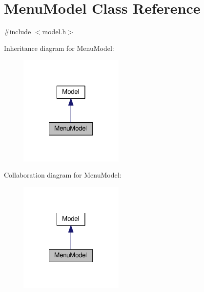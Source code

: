\hypertarget{classMenuModel}{\section{Menu\-Model Class Reference}
\label{classMenuModel}
}


{\ttfamily \#include $<$model.\-h$>$}



Inheritance diagram for Menu\-Model\-:
\nopagebreak
\begin{figure}[H]
\begin{center}
\leavevmode
\includegraphics[width=146pt]{classMenuModel__inherit__graph}
\end{center}
\end{figure}


Collaboration diagram for Menu\-Model\-:
\nopagebreak
\begin{figure}[H]
\begin{center}
\leavevmode
\includegraphics[width=146pt]{classMenuModel__coll__graph}
\end{center}
\end{figure}
